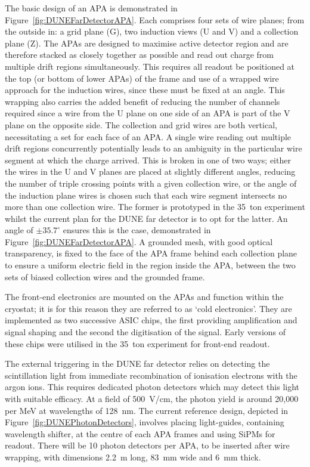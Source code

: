 The basic design of an APA is demonstrated in Figure~\ref{fig:DUNEFarDetectorAPA}.  Each comprises four sets of wire planes; from the outside in: a grid plane (G), two induction views (U and V) and a collection plane (Z).  The APAs are designed to maximise active detector region and are therefore stacked as closely together as possible and read out charge from multiple drift regions simultaneously.  This requires all readout be positioned at the top (or bottom of lower APAs) of the frame and use of a wrapped wire approach for the induction wires, since these must be fixed at an angle.  This wrapping also carries the added benefit of reducing the number of channels required since a wire from the U plane on one side of an APA is part of the V plane on the opposite side.  The collection and grid wires are both vertical, necessitating a set for each face of an APA.  A single wire reading out multiple drift regions concurrently potentially leads to an ambiguity in the particular wire segment at which the charge arrived.  This is broken in one of two ways; either the wires in the U and V planes are placed at slightly different angles, reducing the number of triple crossing points with a given collection wire, or the angle of the induction plane wires is chosen such that each wire segment intersects no more than one collection wire.  The former is prototyped in the 35~ton experiment whilst the current plan for the DUNE far detector is to opt for the latter.  An angle of $\pm35.7^{\circ}$ ensures this is the case, demonstrated in Figure~\ref{fig:DUNEFarDetectorAPA}.  A grounded mesh, with good optical transparency, is fixed to the face of the APA frame behind each collection plane to ensure a uniform electric field in the region inside the APA, between the two sets of biased collection wires and the grounded frame.

The front-end electronics are mounted on the APAs and function within the cryostat; it is for this reason they are referred to as `cold electronics'.  They are implemented as two successive ASIC chips, the first providing amplification and signal shaping and the second the digitisation of the signal.  Early versions of these chips were utilised in the 35~ton experiment for front-end readout.

The external triggering in the DUNE far detector relies on detecting the scintillation light from immediate recombination of ionisation electrons with the argon ions.  This requires dedicated photon detectors which may detect this light with suitable efficacy.  At a field of 500~V/cm, the photon yield is around 20,000 per MeV at wavelengths of 128~nm.  The current reference design, depicted in Figure~\ref{fig:DUNEPhotonDetectors}, involves placing light-guides, containing wavelength shifter, at the centre of each APA frames and using SiPMs for readout.  There will be 10 photon detectors per APA, to be inserted after wire wrapping, with dimensions 2.2~m long, 83~mm wide and 6~mm thick.

